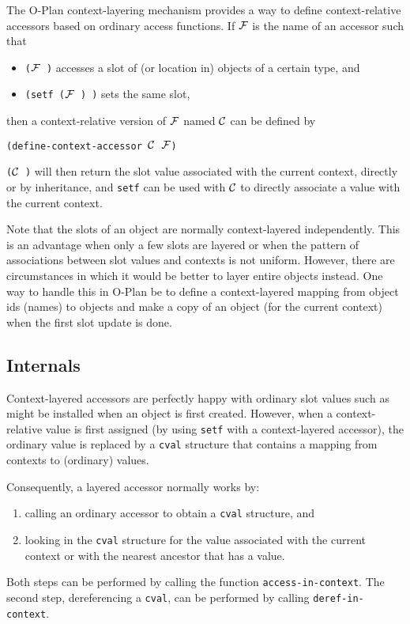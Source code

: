 The O-Plan context-layering mechanism provides a way to define
context-relative accessors based on ordinary access functions.
If $\cal{F}$ is the name of an accessor such that 
\begin{itemize}
\item {\tt ($\cal{F}$ )} accesses a slot of (or location in)
      objects  of a certain type, and
\item {\tt (setf ($\cal{F}$ ) )} sets the same slot,
\end{itemize}
then a context-relative version of $\cal{F}$ named $\cal{C}$ can be
defined by

\begin{tabbing}
{\tt (define-context-accessor $\cal{C}$ $\cal{F}$)}
\end{tabbing}

\noindent
{\tt ($\cal{C}$ )} will then return the slot value associated
with the current context, directly or by inheritance, and {\tt setf}
can be used with $\cal{C}$ to directly associate a value with the
current context.

Note that the slots of an object are normally context-layered
independently.  This is an advantage when only a few slots are layered
or when the pattern of associations between slot values and contexts
is not uniform.  However, there are circumstances in which it would be
better to layer entire objects instead.  One way to handle this in
O-Plan be to define a context-layered mapping from object ids (names)
to objects and make a copy of an object (for the current context)
when the first slot update is done.  


\subsection{Internals}

Context-layered accessors are perfectly happy with ordinary slot
values such as might be installed when an object is first created.
However, when a context-relative value is first assigned (by using
{\tt setf} with a context-layered accessor), the ordinary value
is replaced by a {\tt cval} structure that contains a mapping from
contexts to (ordinary) values.

Consequently, a layered accessor normally works by:
\begin{enumerate}
\item calling an ordinary accessor to obtain a {\tt cval} structure,
      and
\item looking in the {\tt cval} structure for the value associated
      with the current context or with the nearest ancestor that has a
      value.
\end{enumerate}
Both steps can be performed by calling the function {\tt access-in-context}.
The second step, dereferencing a {\tt cval}, can be performed by
calling {\tt deref-in-context}.

